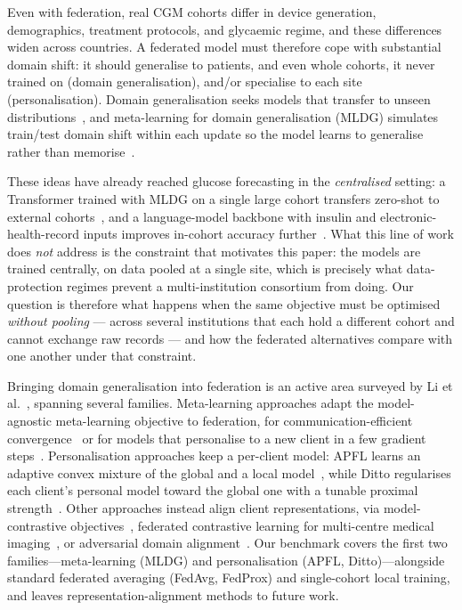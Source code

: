 \documentclass[10pt,letterpaper]{article}
\begin{document}
Even with federation, real CGM cohorts differ in device generation, demographics,
treatment protocols, and glycaemic regime, and these differences widen across
countries. A federated model must therefore cope with substantial domain shift: it
should generalise to patients, and even whole cohorts, it never trained on (domain
generalisation), and/or specialise to each site (personalisation). Domain
generalisation seeks models that transfer to unseen
distributions~\cite{zhou2022dgsurvey}, and meta-learning for domain generalisation
(MLDG) simulates train/test domain shift within each update so the model learns to
generalise rather than memorise~\cite{li2018mldg}.

These ideas have already reached glucose forecasting in the \emph{centralised}
setting: a Transformer trained with MLDG on a single large cohort transfers
zero-shot to external cohorts~\cite{zhu2024gpformer}, and a language-model
backbone with insulin and electronic-health-record inputs improves in-cohort
accuracy further~\cite{zhu2026glullm}. What this line of work does \emph{not}
address is the constraint that motivates this paper: the models are trained
centrally, on data pooled at a single site, which is precisely what
data-protection regimes prevent a multi-institution consortium from doing. Our
question is therefore what happens when the same objective must be
optimised \emph{without pooling} --- across several institutions that each hold a
different cohort and cannot exchange raw records --- and how the federated
alternatives compare with one another under that constraint.

Bringing domain generalisation into federation is an active area surveyed by Li
et al.~\cite{li2025fedDGsurvey}, spanning several families. Meta-learning approaches adapt the model-agnostic
meta-learning objective to federation, for communication-efficient
convergence~\cite{chen2018fedmeta} or for models that personalise to a new client
in a few gradient steps~\cite{fallah2020perfedavg}. Personalisation approaches keep
a per-client model: APFL learns an adaptive convex mixture of the global and a
local model~\cite{deng2020apfl}, while Ditto regularises each client's personal
model toward the global one with a tunable proximal strength~\cite{li2021ditto}.
Other approaches instead align client representations, via model-contrastive
objectives~\cite{li2021moon}, federated contrastive learning for multi-centre
medical imaging~\cite{fedcl2023}, or adversarial domain
alignment~\cite{flda2023,fedadv2022}. Our benchmark covers the first two
families---meta-learning (MLDG) and personalisation (APFL, Ditto)---alongside
standard federated averaging (FedAvg, FedProx) and single-cohort local training,
and leaves representation-alignment methods to future work.
\end{document}

